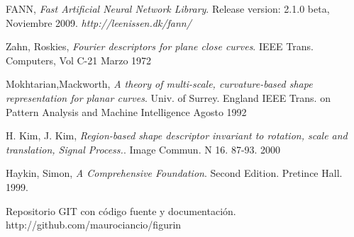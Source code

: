 \documentclass[pdftex,a4paper,10.5pt]{article}
\begin{document}
\begin{thebibliography}{9}
  FANN, 
  \emph{Fast Artificial Neural Network Library}. 
  Release version: 2.1.0 beta, 
  Noviembre 2009.
  \textsl{http://leenissen.dk/fann/}
 
  Zahn, Roskies, 
  \emph{Fourier descriptors for plane close curves}. 
  IEEE Trans. Computers, Vol C-21
  Marzo 1972

 Mokhtarian,Mackworth,
  \emph{A theory of multi-scale, curvature-based shape representation for planar curves}. 
  Univ. of Surrey. England
  IEEE Trans. on Pattern Analysis and Machine Intelligence
  Agosto 1992

  H. Kim, J. Kim,
  \emph{Region-based shape descriptor invariant to rotation, scale and translation, Signal Process.}. 
  Image Commun. N 16. 87-93.
  2000

 Haykin, Simon, 
 \emph{A Comprehensive Foundation}.
 Second Edition. Pretince Hall.
 1999.

	Repositorio GIT con c\'odigo fuente y documentaci\'on. http://github.com/maurociancio/figurin
  
\end{thebibliography}

\end{document}
